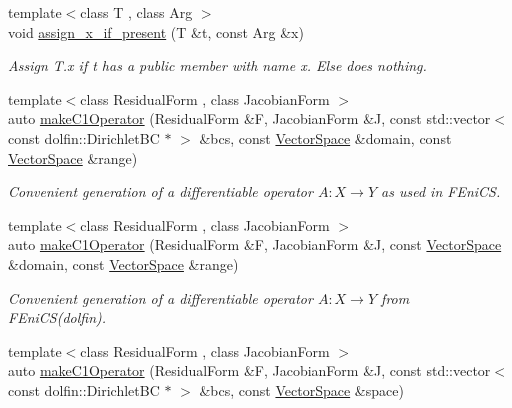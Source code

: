 \begin{DoxyCompactItemize}
\item 
\hypertarget{namespaceSpacy_1_1FEniCS_a8b026331ea4b807e97cc64cb765e6a73}{{\footnotesize template$<$class T , class Arg $>$ }\\void \hyperlink{namespaceSpacy_1_1FEniCS_a8b026331ea4b807e97cc64cb765e6a73}{assign\-\_\-x\-\_\-if\-\_\-present} (T \&t, const Arg \&x)}\label{namespaceSpacy_1_1FEniCS_a8b026331ea4b807e97cc64cb765e6a73}

\begin{DoxyCompactList}\small\item\em Assign T.\-x if t has a public member with name x. Else does nothing. \end{DoxyCompactList}\item 
{\footnotesize template$<$class Residual\-Form , class Jacobian\-Form $>$ }\\auto \hyperlink{namespaceSpacy_1_1FEniCS_a5ff124eb62c7d5b69a5ab4aa196a2453}{make\-C1\-Operator} (Residual\-Form \&F, Jacobian\-Form \&J, const std\-::vector$<$ const dolfin\-::\-Dirichlet\-B\-C $\ast$ $>$ \&bcs, const \hyperlink{classSpacy_1_1VectorSpace}{Vector\-Space} \&domain, const \hyperlink{classSpacy_1_1VectorSpace}{Vector\-Space} \&range)
\begin{DoxyCompactList}\small\item\em Convenient generation of a differentiable operator $A: X\rightarrow Y$ as used in F\-Eni\-C\-S. \end{DoxyCompactList}\item 
{\footnotesize template$<$class Residual\-Form , class Jacobian\-Form $>$ }\\auto \hyperlink{namespaceSpacy_1_1FEniCS_a8b625ee36b2bee78a517d91031572c81}{make\-C1\-Operator} (Residual\-Form \&F, Jacobian\-Form \&J, const \hyperlink{classSpacy_1_1VectorSpace}{Vector\-Space} \&domain, const \hyperlink{classSpacy_1_1VectorSpace}{Vector\-Space} \&range)
\begin{DoxyCompactList}\small\item\em Convenient generation of a differentiable operator $A: X\rightarrow Y$ from F\-Eni\-C\-S(dolfin). \end{DoxyCompactList}\item 
{\footnotesize template$<$class Residual\-Form , class Jacobian\-Form $>$ }\\auto \hyperlink{namespaceSpacy_1_1FEniCS_ac2ffc6f5956faffe26cc9e0ef59209c3}{make\-C1\-Operator} (Residual\-Form \&F, Jacobian\-Form \&J, const std\-::vector$<$ const dolfin\-::\-Dirichlet\-B\-C $\ast$ $>$ \&bcs, const \hyperlink{classSpacy_1_1VectorSpace}{Vector\-Space} \&space)

\end{DoxyCompactItemize}
